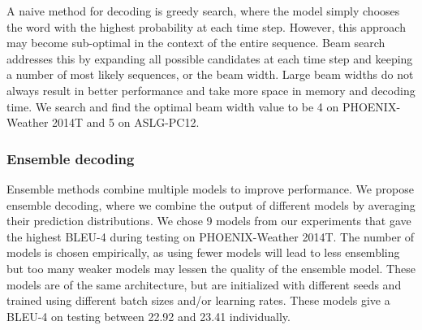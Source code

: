 \documentclass[11pt]{article}
\begin{document}
\begin{center}
\tiny
{}
\label{fig:beam}
\end{center}

A naive method for decoding is greedy search, where the model simply chooses the word with the highest probability at each time step. However, this approach may become sub-optimal in the context of the entire sequence. Beam search addresses this by expanding all possible candidates at each time step and keeping a number of most likely sequences, or the beam width. Large beam widths do not always result in better performance and take more space in memory and decoding time. We search and find the optimal beam width value to be 4 on PHOENIX-Weather 2014T and 5 on ASLG-PC12.


\subsubsection*{Ensemble decoding}
Ensemble methods combine multiple models to improve performance. We propose ensemble decoding, where we combine the output of different models by averaging their prediction distributions. We chose 9 models from our experiments that gave the highest BLEU-4 during testing on PHOENIX-Weather 2014T. The number of models is chosen empirically, as using fewer models will lead to less ensembling but too many weaker models may lessen the quality of the ensemble model. These models are of the same architecture, but are initialized with different seeds and trained using different batch sizes and/or learning rates. These models give a BLEU-4 on testing between 22.92 and 23.41 individually.
\end{document}

